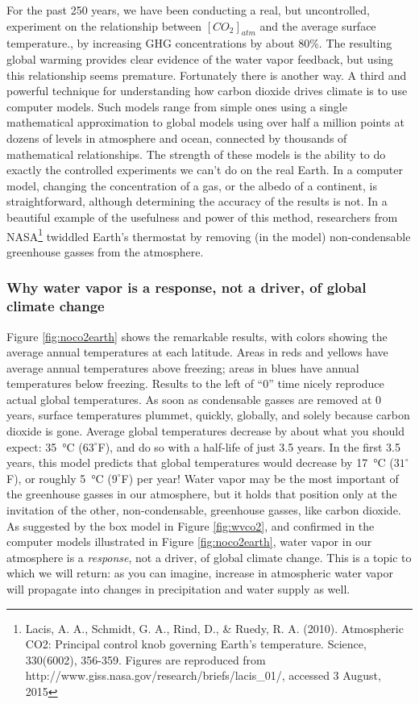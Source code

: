 \documentclass[amstex,12pt]{book}
\begin{document}
For the past 250 years, we have been conducting a real, but uncontrolled, experiment on the relationship between $[CO_2]_{atm}$ and the average surface temperature., by increasing GHG concentrations by about 80\%. The resulting global warming provides clear evidence of the water vapor feedback, but using this relationship seems premature. Fortunately there is another way. A third and powerful technique for understanding how carbon dioxide drives climate is to use computer models. Such models range from simple ones using a single mathematical approximation to global models using over half a million points at dozens of levels in atmosphere and ocean, connected by thousands of mathematical relationships. The strength of these models is the ability to do exactly the controlled experiments we can't do on the real Earth. In a computer model, changing the concentration of a gas, or the albedo of a continent, is straightforward, although determining the accuracy of the results is not. In a beautiful example of the usefulness and power of this method, researchers from NASA\footnote{Lacis, A. A., Schmidt, G. A., Rind, D., \& Ruedy, R. A. (2010). Atmospheric CO2: Principal control knob governing Earth's temperature. Science, 330(6002), 356-359. Figures are reproduced from http://www.giss.nasa.gov/research/briefs/lacis\_01/, accessed 3 August, 2015} twiddled Earth's thermostat by removing (in the model) non-condensable greenhouse gasses from the atmosphere. 

\subsubsection{Why water vapor is a response, not a driver, of global climate change}
Figure \ref{fig:noco2earth} shows the remarkable results, with colors showing the average annual temperatures at each latitude. Areas in reds and yellows have average annual temperatures above freezing; areas in blues have annual temperatures below freezing. Results to the left of ``0'' time nicely reproduce actual global temperatures.  As soon as condensable gasses are removed at 0 years, surface temperatures plummet, quickly, globally, and solely because carbon dioxide is gone. Average global temperatures decrease by about what you should expect: \SI{35}{\celsius} ($63^{\circ}$F), and do so with a half-life of just 3.5 years. In the first 3.5 years, this model predicts that global temperatures would decrease by \SI{17}{\celsius} ($31^{\circ}$F), or roughly \SI{5}{\celsius} ($9^{\circ}$F) per year! Water vapor may be the most important of the greenhouse gasses in our atmosphere, but it holds that position only at the invitation of the other, non-condensable, greenhouse gasses, like carbon dioxide. As suggested by the box model in Figure \ref{fig:wvco2}, and confirmed in the computer models illustrated in Figure \ref{fig:noco2earth}, water vapor in our atmosphere is a \emph{response}, not a driver, of global climate change. This is a topic to which we will return: as you can imagine, increase in atmospheric water vapor will propagate into changes in precipitation and water supply as well. 
\end{document}
